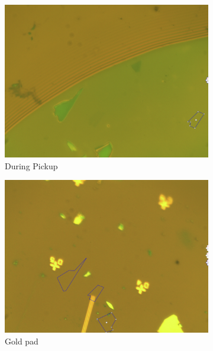 \begin{figure}[H]
\begin{subfigure}[b]{0.4\textwidth}
         \includegraphics[width=\textwidth]{figures/during_pickup.jpg}
         \caption{During Pickup}
     \end{subfigure}
     \qquad
     \begin{subfigure}[b]{0.4\textwidth}
         \centering
         \includegraphics[width=\textwidth]{figures/gold_pad.jpg}
         \caption{Gold pad}
     \end{subfigure}
     \begin{subfigure}[b]{0.4\textwidth}
         \centering

\end{subfigure}
\end{figure}
